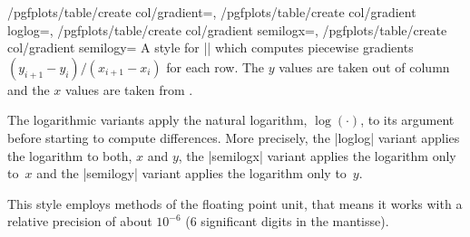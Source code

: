 \begin{keylist}{
	/pgfplots/table/create col/gradient=,
	/pgfplots/table/create col/gradient loglog=,
	/pgfplots/table/create col/gradient semilogx=,
	/pgfplots/table/create col/gradient semilogy=}
	A style for |\pgfplotstablecreatecol| which computes piecewise gradients $(y_{i+1} - y_i) / (x_{i+1} - x_i )$ for each row. The $y$ values are taken out of column  and the $x$ values are taken from .
	
	The logarithmic variants apply the natural logarithm, $\log(\cdot)$, to its argument before starting to compute differences. More precisely, the |loglog| variant applies the logarithm to both, $x$ and $y$, the |semilogx| variant applies the logarithm only to~$x$ and the |semilogy| variant applies the logarithm only to~$y$.
	
\begin{codeexample}[]
\end{codeexample}

\begin{codeexample}[]
\end{codeexample}
	This style employs methods of the floating point unit, that means it works with a relative precision of about $10^{-6}$ ($6$ significant digits in the mantisse).
\end{keylist}

